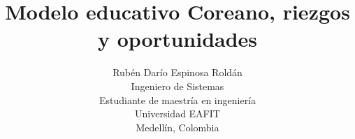 
\pagestyle{empty}


\setlength{\textheight}{8.75in}
\setlength{\columnsep}{2.0pc}
\setlength{\textwidth}{6.8in}
\setlength{\footheight}{0.0in}
\setlength{\topmargin}{0.25in}
\setlength{\headheight}{0.0in}
\setlength{\headsep}{0.0in}
\setlength{\oddsidemargin}{-.19in}
\setlength{\parindent}{1pc}



\makeatletter
\def\@normalsize{\@setsize\normalsize{12pt}\xpt\@xpt
\abovedisplayskip 10pt plus2pt minus5pt\belowdisplayskip \abovedisplayskip
\abovedisplayshortskip \z@ plus3pt\belowdisplayshortskip 6pt plus3pt
minus3pt\let\@listi\@listI} 

\def\subsize{\@setsize\subsize{12pt}\xipt\@xipt}

\def\section{\@startsection {section}{1}{\z@}{24pt plus 2pt minus 2pt}
{12pt plus 2pt minus 2pt}{\large\bf}}

\def\subsection{\@startsection {subsection}{2}{\z@}{12pt plus 2pt minus 2pt}
{12pt plus 2pt minus 2pt}{\subsize\bf}}
\makeatother



\date{}

\title{\Large\bf Modelo educativo Coreano, riezgos y oportunidades}

\author{Rub\'en Dar\'io Espinosa Rold\'an  \\
  Ingeniero de Sistemas\\
  Estudiante de maestr\'ia en ingenier\'ia\\
  Universidad EAFIT  \\
  Medell\'in, Colombia}
 
